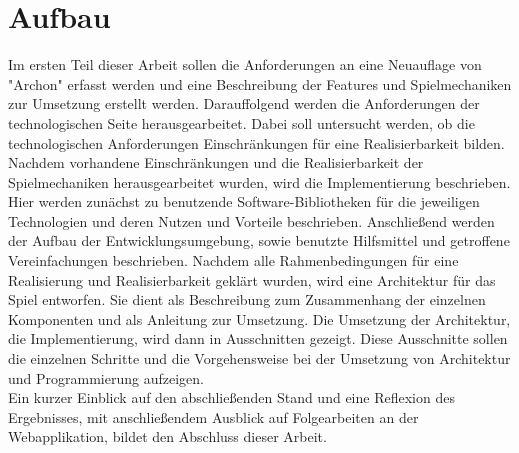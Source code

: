 \section{Aufbau}
\label{sec:aufbau}

Im ersten Teil dieser Arbeit sollen die Anforderungen an eine Neuauflage von "Archon" erfasst werden und eine Beschreibung der Features und Spielmechaniken zur Umsetzung erstellt werden.
Darauffolgend werden die Anforderungen der technologischen Seite herausgearbeitet. Dabei soll untersucht werden, ob die technologischen Anforderungen Einschränkungen für eine Realisierbarkeit bilden.\\
Nachdem \ggf vorhandene Einschränkungen und die Realisierbarkeit der Spielmechaniken herausgearbeitet wurden, wird die Implementierung beschrieben. Hier werden zunächst zu benutzende Software-Bibliotheken für die jeweiligen Technologien und deren Nutzen und Vorteile beschrieben.
Anschließend werden der Aufbau der Entwicklungsumgebung, sowie benutzte Hilfsmittel und getroffene Vereinfachungen beschrieben.
Nachdem alle Rahmenbedingungen für eine Realisierung und Realisierbarkeit geklärt wurden, wird eine Architektur für das Spiel entworfen. Sie dient als Beschreibung zum Zusammenhang der einzelnen Komponenten und als Anleitung zur Umsetzung.
Die Umsetzung der Architektur, die Implementierung, wird dann in Ausschnitten gezeigt. Diese Ausschnitte sollen die einzelnen Schritte und die Vorgehensweise bei der Umsetzung von Architektur und Programmierung aufzeigen.\\
Ein kurzer Einblick auf den abschließenden Stand und eine Reflexion des Ergebnisses, mit anschließendem Ausblick auf Folgearbeiten an der Webapplikation, bildet den Abschluss dieser Arbeit.